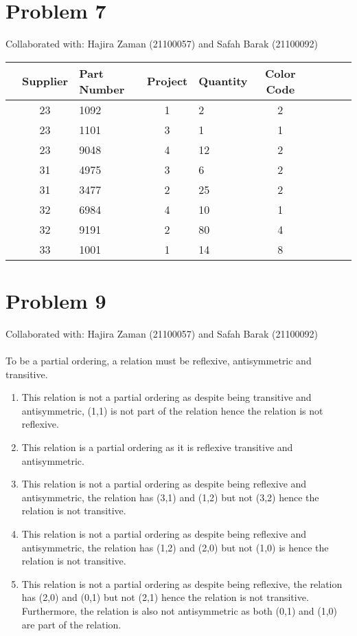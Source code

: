 \documentclass{article}
\begin{document}
\section{Problem 7}
Collaborated with: Hajira Zaman (21100057) and Safah Barak (21100092)
\begin{table}[h]
\begin{tabular}{lclclclclc|}
\hline
 &Supplier & Part Number & Project & Quantity & Color Code & \\
 \hline
 &23 & 1092  & 1   & \hspace{3mm}  2    & 2 &  \\ 
 \hline
 &23 & 1101  & 3  &\hspace{3mm} 1      & 1 & \\ 
 \hline
 &23 & 9048  & 4  &\hspace{3mm}  12     & 2 & \\ 
 \hline
 &31 & 4975  & 3  &\hspace{3mm}   6    &2  & \\ 
 \hline
 &31 & 3477  & 2  &\hspace{3mm}  25     & 2 & \\ 
 \hline
 &32 & 6984  & 4  &\hspace{3mm}   10    & 1 & \\ 
 \hline
 &32& 9191  &2   &\hspace{3mm} 80      & 4 &  \\ 
 \hline
 &33& 1001  & 1  &\hspace{3mm}  14     &8 &
\end{tabular}
\end{table}
\section{Problem 9}
Collaborated with: Hajira Zaman (21100057) and Safah Barak (21100092)\\\\
To be a partial ordering, a relation must be reflexive, antisymmetric and transitive.\\
\begin{enumerate}
\item %
This relation is not a partial ordering as despite being transitive and antisymmetric, (1,1) is not part of the relation hence the relation is not reflexive. 
\item %
This relation is a partial ordering as it is reflexive transitive and antisymmetric.
\item %
This relation is not a partial ordering as despite being reflexive and antisymmetric, the relation has (3,1) and (1,2) but not (3,2) hence the relation is not transitive. 
\item %
This relation is not a partial ordering as despite being reflexive and antisymmetric, the relation has (1,2) and (2,0) but not (1,0) is hence the relation is not transitive. 
\item %
This relation is not a partial ordering as despite being reflexive, the relation has (2,0) and (0,1) but not (2,1) hence the relation is not transitive. Furthermore, the relation is also not antisymmetric as both (0,1) and (1,0) are part of the relation.
\end{enumerate}
\end{document}
